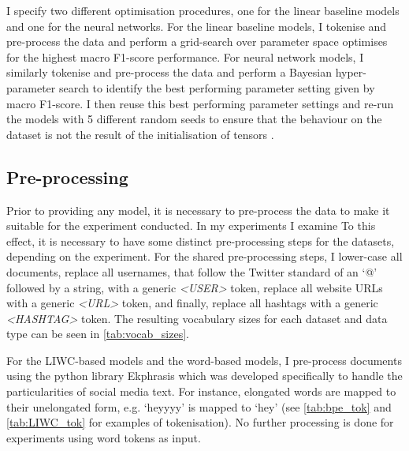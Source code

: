 I specify two different optimisation procedures, one for the linear baseline models and one for the neural networks.
For the linear baseline models, I tokenise and pre-process the data and perform a grid-search over  parameter space  optimises for the highest macro F1-score performance.
For neural network models, I similarly tokenise and pre-process the data and perform a Bayesian hyper-parameter search to identify the best performing parameter setting given by macro F1-score.
I then reuse this best performing parameter settings and re-run the models with 5 different random seeds to ensure that the  behaviour on the dataset is not the result of the  initialisation of  tensors .

\subsection{Pre-processing}
Prior to providing  any model, it is necessary to pre-process the data to make it suitable for the experiment conducted.
In my experiments I examine 
To this effect, it is necessary to have some  distinct pre-processing steps for the datasets, depending on the experiment.
For the shared pre-processing steps, I lower-case all documents, replace all usernames, that follow the Twitter standard of an `@' followed by a string, with a generic \textit{<USER>} token, replace all website URLs with a generic \textit{<URL>} token, and finally, replace all hashtags with a generic \textit{<HASHTAG>} token.
The resulting vocabulary sizes for each dataset and data type can be seen in \cref{tab:vocab_sizes}.

For the LIWC-based models and the word-based models, I pre-process documents using the python library Ekphrasis \citep{baziotis:2017} which was developed specifically to handle the particularities of social media text.
For instance, elongated words are mapped to their unelongated form, e.g. `heyyyy' is mapped to `hey' (see \cref{tab:bpe_tok} and \cref{tab:LIWC_tok} for examples of tokenisation).
No further processing is done for experiments using word tokens as input.

